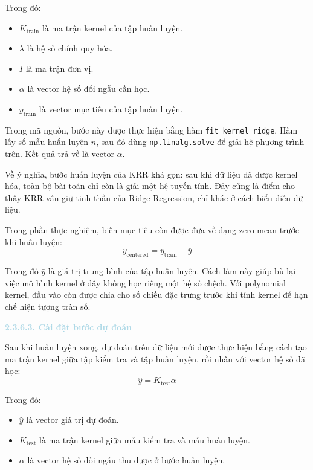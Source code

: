 Trong đó:
\begin{itemize}
    \item $K_{\mathrm{train}}$ là ma trận kernel của tập huấn luyện.
    \item $\lambda$ là hệ số chính quy hóa.
    \item $I$ là ma trận đơn vị.
    \item $\alpha$ là vector hệ số đối ngẫu cần học.
    \item $y_{\mathrm{train}}$ là vector mục tiêu của tập huấn luyện.
\end{itemize}

Trong mã nguồn, bước này được thực hiện bằng hàm \texttt{fit\_kernel\_ridge}. Hàm lấy số mẫu huấn luyện $n$, sau đó dùng \texttt{np.linalg.solve} để giải hệ phương trình trên. Kết quả trả về là vector $\alpha$.

Về ý nghĩa, bước huấn luyện của KRR khá gọn: sau khi dữ liệu đã được kernel hóa, toàn bộ bài toán chỉ còn là giải một hệ tuyến tính. Đây cũng là điểm cho thấy KRR vẫn giữ tinh thần của Ridge Regression, chỉ khác ở cách biểu diễn dữ liệu.

Trong phần thực nghiệm, biến mục tiêu còn được đưa về dạng zero-mean trước khi huấn luyện:
\begin{equation}
    y_{\mathrm{centered}} = y_{\mathrm{train}} - \bar{y}
\end{equation}

Trong đó $\bar{y}$ là giá trị trung bình của tập huấn luyện. Cách làm này giúp bù lại việc mô hình kernel ở đây không học riêng một hệ số chệch. Với polynomial kernel, đầu vào còn được chia cho số chiều đặc trưng trước khi tính kernel để hạn chế hiện tượng tràn số.

\noindent\textcolor{lightblue}{\textbf{2.3.6.3. Cài đặt bước dự đoán}}

Sau khi huấn luyện xong, dự đoán trên dữ liệu mới được thực hiện bằng cách tạo ma trận kernel giữa tập kiểm tra và tập huấn luyện, rồi nhân với vector hệ số đã học:
\begin{equation}
    \hat{y} = K_{\mathrm{test}}\alpha
\end{equation}

Trong đó:
\begin{itemize}
    \item $\hat{y}$ là vector giá trị dự đoán.
    \item $K_{\mathrm{test}}$ là ma trận kernel giữa mẫu kiểm tra và mẫu huấn luyện.
    \item $\alpha$ là vector hệ số đối ngẫu thu được ở bước huấn luyện.
\end{itemize}

